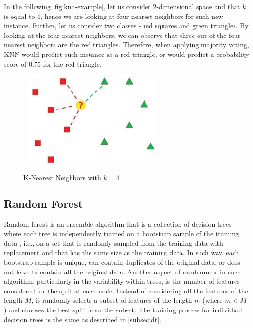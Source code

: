 In the following \autoref{fig:knn-example}, let us consider 2-dimensional space and that $k$ is equal to 4, hence we are looking at four nearest neighbors for such new instance. Further, let us consider two classes - red squares and green triangles.
By looking at the four nearest neighbors, we can observe that three out of the four nearest neighbors are the red triangles.
Therefore, when applying majority voting, KNN would predict such instance as a red triangle, or would predict a probability score of 0.75 for the red triangle.


\begin{figure}[H]
    \centering
    \caption{K-Nearest Neighbors with $k=4$}\vspace{0.5em}
    \label{fig:knn-example}\
    \includegraphics[width=70mm]{Figures/KNN_example.jpg}

    \vspace{-1em}
\end{figure}
\newpage
\subsection{Random Forest}

Random forest is an ensemble algorithm that is a collection of decision trees where each tree is independently trained on a bootstrap sample of the training data \citep{han2011data}, i.e., on a set that is randomly sampled from the training data with replacement and that has the same size as the training data. In such way, each bootstrap sample is unique, can contain duplicates of the original data, or does not have to contain all the original data.
Another aspect of randomness in such algorithm, particularly in the variability within trees, is the number of features considered for the split at each node.
Instead of considering all the features of the length $M$, it randomly selects a subset of features of the length $m$ (where $m<M$) and chooses the best split from the subset.
The training process for individual decision trees is the same as described in \autoref{subsec:dt}.


